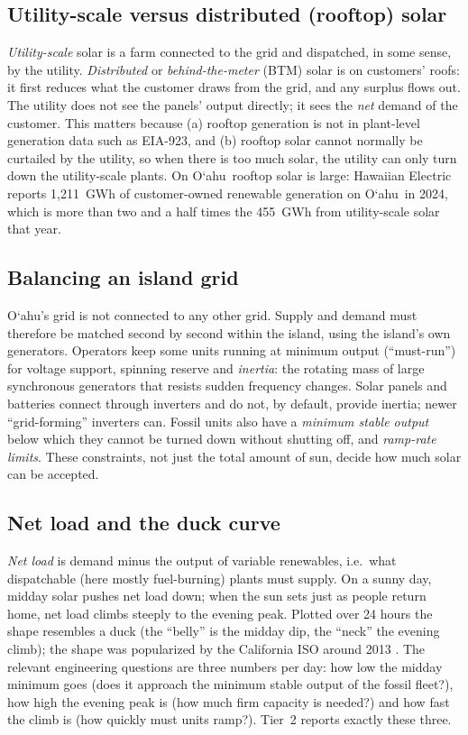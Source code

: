 \documentclass[11pt,a4paper]{article}
\newcommand{\okina}{\textquoteleft}
\newcommand{\Oahu}{\texorpdfstring{O\okina ahu}{Oahu}}
\begin{document}
\subsection{Utility-scale versus distributed (rooftop) solar}
\emph{Utility-scale} solar is a farm connected to the grid and dispatched, in some sense, by the utility.
\emph{Distributed} or \emph{behind-the-meter} (BTM) solar is on customers' roofs: it first reduces what the
customer draws from the grid, and any surplus flows out. The utility does not see the panels' output directly;
it sees the \emph{net} demand of the customer. This matters because (a) rooftop generation is not in plant-level
generation data such as EIA-923, and (b) rooftop solar cannot normally be curtailed by the utility, so when
there is too much solar, the utility can only turn down the utility-scale plants. On \Oahu\ rooftop solar is
large: Hawaiian Electric reports 1,211~GWh of customer-owned renewable generation on \Oahu\ in 2024, which is more than two and a half times the 455~GWh from utility-scale solar that year.

\subsection{Balancing an island grid}
\Oahu's grid is not connected to any other grid. Supply and demand must therefore be matched second by second
within the island, using the island's own generators. Operators keep some units running at minimum output
(``must-run'') for voltage support, spinning reserve and \emph{inertia}: the rotating mass of large synchronous
generators that resists sudden frequency changes. Solar panels and batteries connect through inverters and do not,
by default, provide inertia; newer ``grid-forming'' inverters can. Fossil units also have a
\emph{minimum stable output} below which they cannot be turned down without shutting off, and \emph{ramp-rate
limits}. These constraints, not just the total amount of sun, decide how much solar can be accepted.

\subsection{Net load and the duck curve}
\emph{Net load} is demand minus the output of variable renewables, i.e.\ what dispatchable (here mostly
fuel-burning) plants must supply. On a sunny day, midday solar pushes net load down; when the sun sets just as
people return home, net load climbs steeply to the evening peak. Plotted over 24 hours the shape resembles a duck
(the ``belly'' is the midday dip, the ``neck'' the evening climb); the shape was popularized by the California
ISO around 2013 \cite{caiso}. The relevant engineering questions are three numbers per day: how low the midday
minimum goes (does it approach the minimum stable output of the fossil fleet?), how high the evening peak is (how
much firm capacity is needed?) and how fast the climb is (how quickly must units ramp?). Tier~2 reports exactly
these three.
\end{document}
